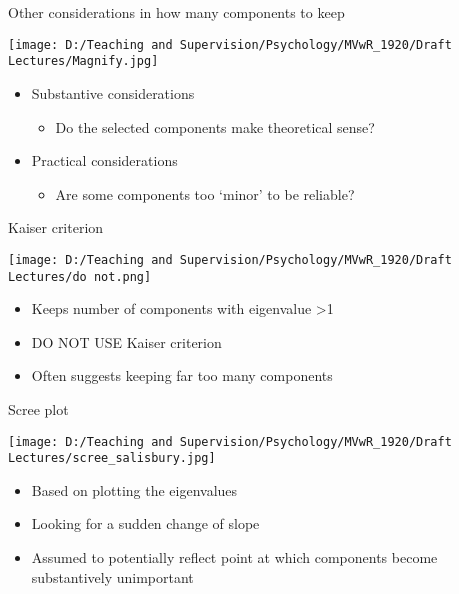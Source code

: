 \documentclass[
  ignorenonframetext,
]{beamer}
\providecommand{\tightlist}{%
  \setlength{\itemsep}{0pt}\setlength{\parskip}{0pt}}
\begin{document}
\begin{frame}{Other considerations in how many components to keep}
\protect\hypertarget{other-considerations-in-how-many-components-to-keep}{}

\texttt{[image: D:/Teaching and Supervision/Psychology/MVwR\_1920/Draft Lectures/Magnify.jpg]}

\begin{itemize}
\tightlist
\item
  Substantive considerations

  \begin{itemize}
  \tightlist
  \item
    Do the selected components make theoretical sense?
  \end{itemize}
\item
  Practical considerations

  \begin{itemize}
  \tightlist
  \item
    Are some components too `minor' to be reliable?
  \end{itemize}
\end{itemize}

\end{frame}

\begin{frame}{Kaiser criterion}
\protect\hypertarget{kaiser-criterion}{}

\texttt{[image: D:/Teaching and Supervision/Psychology/MVwR\_1920/Draft Lectures/do not.png]}

\begin{itemize}
\tightlist
\item
  Keeps number of components with eigenvalue \textgreater1
\item
  DO NOT USE Kaiser criterion
\item
  Often suggests keeping far too many components
\end{itemize}

\end{frame}

\begin{frame}{Scree plot}
\protect\hypertarget{scree-plot}{}

\texttt{[image: D:/Teaching and Supervision/Psychology/MVwR\_1920/Draft Lectures/scree\_salisbury.jpg]}

\begin{itemize}
\tightlist
\item
  Based on plotting the eigenvalues
\item
  Looking for a sudden change of slope
\item
  Assumed to potentially reflect point at which components become
  substantively unimportant
\end{itemize}

\end{frame}
\end{document}
